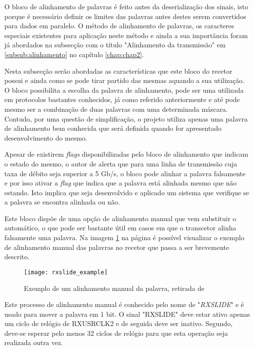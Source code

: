 O bloco de alinhamento de palavras é feito antes da deserialização dos sinais, isto porque é necessário definir os limites das palavras antes destes serem convertidos para dados em paralelo. O método de alinhamento de palavras, os caracteres especiais existentes para aplicação neste método e ainda a sua importância foram já abordados na subsecção com o título "Alinhamento da transmissão" em \ref{subsub:alinhamento} no capítulo \ref{chap:chap2}.

Nesta subsecção serão abordadas as características que este bloco do recetor possui e ainda como se pode tirar partido das mesmas aquando a sua utilização. O bloco possibilita a escolha da palavra de alinhamento, pode ser uma utilizada em protocolos bastantes conhecidos, já como referido anteriormente e até pode mesmo ser a combinação de duas palavras com uma determinada máscara. Contudo, por uma questão de simplificação, o projeto utiliza apenas uma palavra de alinhamento bem conhecida que será definida quando for apresentado desenvolvimento do mesmo.

Apesar de existirem \textit{flags} disponibilizadas pelo bloco de alinhamento que indicam o estado do mesmo, o autor de \cite{R011} alerta que para uma linha de transmissão cuja taxa de débito seja superior a 5 Gb/s, o bloco pode alinhar a palavra falsamente e por isso ativar a \textit{flag} que indica que a palavra está alinhada mesmo que não estando. Isto implica que seja desenvolvido e aplicado um sistema que verifique se a palavra se encontra alinhada ou não.


Este bloco dispõe de uma opção de alinhamento manual que vem substituir o automático, o que pode ser bastante útil em casos em que o transcetor alinha falsamente uma palavra. Na imagem \ref{fig:rxslide_example} na página \pageref{fig:rxslide_example} é possível visualizar o exemplo de alinhamento manual das palavras no recetor que passa a ser brevemente descrito.

\begin{figure}[h!]
	\begin{center}
		\leavevmode
		\texttt{[image: rxslide\_example]}
		\captionsetup{width=1.0\linewidth}
		\caption{Exemplo de um alinhamento manual da palavra, retirada de \cite{R011}}
		\label{fig:rxslide_example}
	\end{center}
\end{figure}

Este processo de alinhamento manual é conhecido pelo nome de "\textit{RXSLIDE}" e é usado para mover a palavra em 1 bit. O sinal "RXSLIDE" deve estar ativo apenas um ciclo de relógio de RXUSRCLK2 e de seguida deve ser inativo. Segundo, \cite{R011} deve-se esperar pelo menos 32 ciclos de relógio para que esta operação seja realizada outra vez.  

